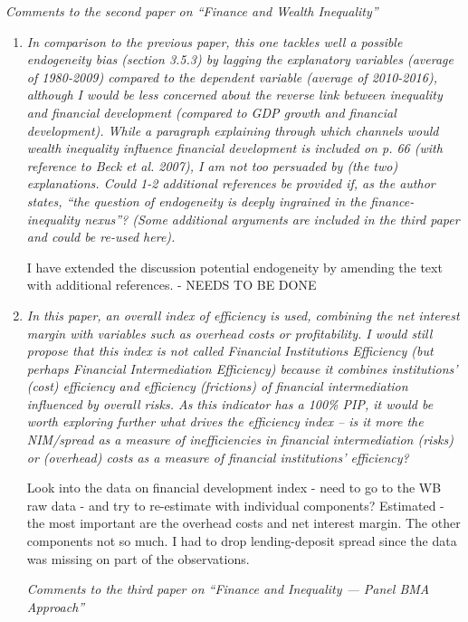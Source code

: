 \noindent \textit{Comments to the second paper on ``Finance and Wealth Inequality''}

\begin{enumerate}[resume]

    \item \textit{In comparison to the previous paper, this one tackles well a possible endogeneity bias (section 3.5.3) by lagging the explanatory variables (average of 1980-2009) compared to the dependent variable (average of 2010-2016), although I would be less concerned about the reverse link between inequality and financial development (compared to GDP growth and financial development). While a paragraph explaining through which channels would wealth inequality influence financial development is included on p. 66 (with reference to Beck et al. 2007), I am not too persuaded by (the two) explanations. Could 1-2 additional references be provided if, as the author states, ``the question of endogeneity is deeply ingrained in the finance-inequality nexus''? (Some additional arguments are included in the third paper and could be re-used here).}
    
    {\color{red}I have extended the discussion potential endogeneity by amending the text with additional references. - NEEDS TO BE DONE}
    
    \item \textit{In this paper, an overall index of efficiency is used, combining the net interest margin with variables such as overhead costs or profitability. I would still propose that this index is not called Financial Institutions Efficiency (but perhaps Financial Intermediation Efficiency) because it combines institutions' (cost) efficiency and efficiency (frictions) of financial intermediation influenced by overall risks. As this indicator has a 100\% PIP, it would be worth exploring further what drives the efficiency index -- is it more the NIM/spread as a measure of inefficiencies in financial intermediation (risks) or (overhead) costs as a measure of financial institutions' efficiency?}
    
    {\color{red} Look into the data on financial development index - need to go to the WB raw data - and try to re-estimate with individual components?}
    Estimated - the most important are the overhead costs and net interest margin. The other components not so much. I had to drop lending-deposit spread since the data was missing on part of the observations.
    
    \noindent \textit{Comments to the third paper on ``Finance and Inequality --- Panel BMA Approach''}


\end{enumerate}
